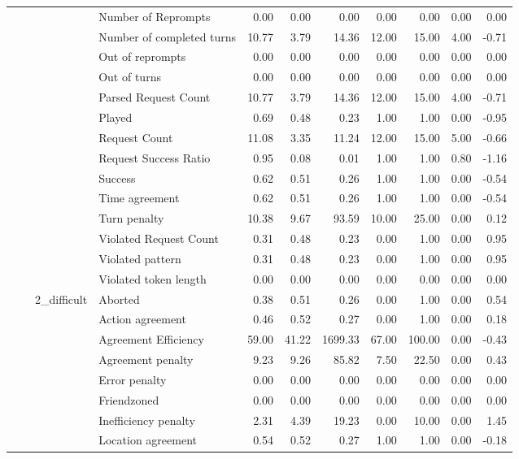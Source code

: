 \begin{tabular}{llllrrrrrrr}
 &  &  & Number of Reprompts & 0.00 & 0.00 & 0.00 & 0.00 & 0.00 & 0.00 & 0.00 \\
 &  &  & Number of completed turns & 10.77 & 3.79 & 14.36 & 12.00 & 15.00 & 4.00 & -0.71 \\
 &  &  & Out of reprompts & 0.00 & 0.00 & 0.00 & 0.00 & 0.00 & 0.00 & 0.00 \\
 &  &  & Out of turns & 0.00 & 0.00 & 0.00 & 0.00 & 0.00 & 0.00 & 0.00 \\
 &  &  & Parsed Request Count & 10.77 & 3.79 & 14.36 & 12.00 & 15.00 & 4.00 & -0.71 \\
 &  &  & Played & 0.69 & 0.48 & 0.23 & 1.00 & 1.00 & 0.00 & -0.95 \\
 &  &  & Request Count & 11.08 & 3.35 & 11.24 & 12.00 & 15.00 & 5.00 & -0.66 \\
 &  &  & Request Success Ratio & 0.95 & 0.08 & 0.01 & 1.00 & 1.00 & 0.80 & -1.16 \\
 &  &  & Success & 0.62 & 0.51 & 0.26 & 1.00 & 1.00 & 0.00 & -0.54 \\
 &  &  & Time agreement & 0.62 & 0.51 & 0.26 & 1.00 & 1.00 & 0.00 & -0.54 \\
 &  &  & Turn penalty & 10.38 & 9.67 & 93.59 & 10.00 & 25.00 & 0.00 & 0.12 \\
 &  &  & Violated Request Count & 0.31 & 0.48 & 0.23 & 0.00 & 1.00 & 0.00 & 0.95 \\
 &  &  & Violated pattern & 0.31 & 0.48 & 0.23 & 0.00 & 1.00 & 0.00 & 0.95 \\
 &  &  & Violated token length & 0.00 & 0.00 & 0.00 & 0.00 & 0.00 & 0.00 & 0.00 \\
\cline{3-11}
 &  & \multirow[t]{27}{*}{2_difficult} & Aborted & 0.38 & 0.51 & 0.26 & 0.00 & 1.00 & 0.00 & 0.54 \\
 &  &  & Action agreement & 0.46 & 0.52 & 0.27 & 0.00 & 1.00 & 0.00 & 0.18 \\
 &  &  & Agreement Efficiency & 59.00 & 41.22 & 1699.33 & 67.00 & 100.00 & 0.00 & -0.43 \\
 &  &  & Agreement penalty & 9.23 & 9.26 & 85.82 & 7.50 & 22.50 & 0.00 & 0.43 \\
 &  &  & Error penalty & 0.00 & 0.00 & 0.00 & 0.00 & 0.00 & 0.00 & 0.00 \\
 &  &  & Friendzoned & 0.00 & 0.00 & 0.00 & 0.00 & 0.00 & 0.00 & 0.00 \\
 &  &  & Inefficiency penalty & 2.31 & 4.39 & 19.23 & 0.00 & 10.00 & 0.00 & 1.45 \\
 &  &  & Location agreement & 0.54 & 0.52 & 0.27 & 1.00 & 1.00 & 0.00 & -0.18 \\

\end{tabular}
